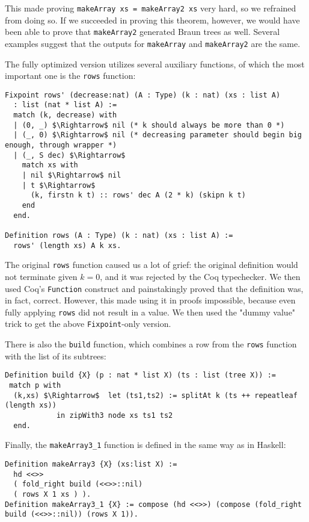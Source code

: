 \documentclass[a4paper,10pt]{article}
\begin{document}
This made proving \texttt{makeArray xs = makeArray2 xs} very hard, so we refrained from doing so.
If we succeeded in proving this theorem, however, we would have been able to prove that \texttt{makeArray2} generated Braun trees as well.
Several examples suggest that the outputs for \texttt{makeArray} and \texttt{makeArray2} are the same.

The fully optimized version utilizes several auxiliary functions, of which the most important one is the \texttt{rows} function:

\begin{lstlisting}[mathescape=true]
Fixpoint rows' (decrease:nat) (A : Type) (k : nat) (xs : list A)
  : list (nat * list A) :=
  match (k, decrease) with
  | (0, _) $\Rightarrow$ nil (* k should always be more than 0 *)
  | (_, 0) $\Rightarrow$ nil (* decreasing parameter should begin big enough, through wrapper *)
  | (_, S dec) $\Rightarrow$ 
    match xs with
    | nil $\Rightarrow$ nil
    | t $\Rightarrow$ 
      (k, firstn k t) :: rows' dec A (2 * k) (skipn k t)
    end
  end.

Definition rows (A : Type) (k : nat) (xs : list A) := 
  rows' (length xs) A k xs.
\end{lstlisting}

The original \texttt{rows} function caused us a lot of grief: the original definition would not terminate given $k=0$, and it was rejected by the Coq typechecker.
We then used Coq's \texttt{Function} construct and painstakingly proved that the definition was, in fact, correct.
However, this made using it in proofs impossible, because even fully applying \texttt{rows} did not result in a value.
We then used the "dummy value" trick to get the above \texttt{Fixpoint}-only version.

There is also the \texttt{build} function, which combines a row from the \texttt{rows} function with the list of its subtrees:

\begin{lstlisting}[mathescape=true]
Definition build {X} (p : nat * list X) (ts : list (tree X)) :=
 match p with
  (k,xs) $\Rightarrow$  let (ts1,ts2) := splitAt k (ts ++ repeatleaf (length xs))
            in zipWith3 node xs ts1 ts2
  end. 
\end{lstlisting}

Finally, the \texttt{makeArray3\_1} function is defined in the same way as in Haskell:

\begin{lstlisting}[mathescape=true]
Definition makeArray3 {X} (xs:list X) := 
  hd <<>>
  ( fold_right build (<<>>::nil)
  ( rows X 1 xs ) ).
Definition makeArray3_1 {X} := compose (hd <<>>) (compose (fold_right build (<<>>::nil)) (rows X 1)).
\end{lstlisting}
\end{document}
